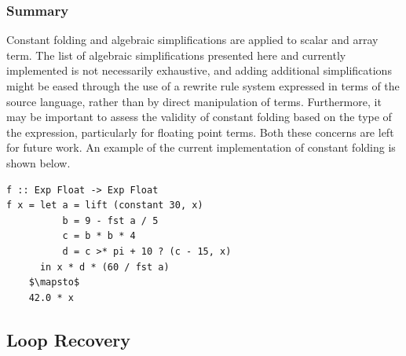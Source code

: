 \subsubsection{Summary}

Constant folding and algebraic simplifications are applied to scalar and array
term. The list of algebraic simplifications presented here and currently
implemented is not necessarily exhaustive, and adding additional simplifications
might be eased through the use of a rewrite rule system expressed in terms of
the source language, rather than by direct manipulation of 
terms. Furthermore, it may be important to assess the validity of constant
folding based on the type of the expression, particularly for floating point
terms. Both these concerns are left for future work. An example of the current
implementation of constant folding is shown below.

\begin{lstlisting}[style=Haskell,mathescape,caption={Example of constant expression evaluation}]
f :: Exp Float -> Exp Float
f x = let a = lift (constant 30, x)
          b = 9 - fst a / 5
          c = b * b * 4
          d = c >* pi + 10 ? (c - 15, x)
      in x * d * (60 / fst a)
    $\mapsto$
    42.0 * x
\end{lstlisting}


\subsection{Loop Recovery}


%

